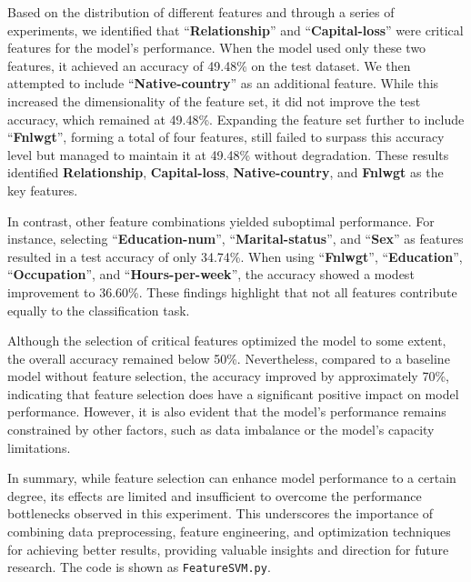 \documentclass[a4paper, utf8]{ctexart}
\begin{document}
	Based on the distribution of different features and through a series of experiments, we identified that ``\textbf{Relationship}'' and ``\textbf{Capital-loss}'' were critical features for the model's performance. When the model used only these two features, it achieved an accuracy of 49.48\% on the test dataset. We then attempted to include ``\textbf{Native-country}'' as an additional feature. While this increased the dimensionality of the feature set, it did not improve the test accuracy, which remained at 49.48\%. Expanding the feature set further to include ``\textbf{Fnlwgt}'', forming a total of four features, still failed to surpass this accuracy level but managed to maintain it at 49.48\% without degradation. These results identified \textbf{Relationship}, \textbf{Capital-loss}, \textbf{Native-country}, and \textbf{Fnlwgt} as the key features.
	
	In contrast, other feature combinations yielded suboptimal performance. For instance, selecting ``\textbf{Education-num}'', ``\textbf{Marital-status}'', and ``\textbf{Sex}'' as features resulted in a test accuracy of only 34.74\%. When using ``\textbf{Fnlwgt}'', ``\textbf{Education}'', ``\textbf{Occupation}'', and ``\textbf{Hours-per-week}'', the accuracy showed a modest improvement to 36.60\%. These findings highlight that not all features contribute equally to the classification task.
	
	Although the selection of critical features optimized the model to some extent, the overall accuracy remained below 50\%. Nevertheless, compared to a baseline model without feature selection, the accuracy improved by approximately 70\%, indicating that feature selection does have a significant positive impact on model performance. However, it is also evident that the model's performance remains constrained by other factors, such as data imbalance or the model's capacity limitations.
	
	In summary, while feature selection can enhance model performance to a certain degree, its effects are limited and insufficient to overcome the performance bottlenecks observed in this experiment. This underscores the importance of combining data preprocessing, feature engineering, and optimization techniques for achieving better results, providing valuable insights and direction for future research. The code is shown as \verb|FeatureSVM.py|.
	
\end{document}
